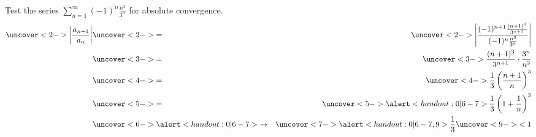 \begin{frame}
\begin{example} %
Test the series $\displaystyle \sum_{n=1}^\infty (-1)^n \frac{n^3}{3^n}$ for absolute convergence.
\abovedisplayskip=0pt
\belowdisplayskip=0pt
\begin{eqnarray*}
\uncover<2->{%
\left| \frac{a_{n+1}}{a_n}\right| %
}%
 & \uncover<2->{=} & %
\uncover<2->{%
\left| \frac{(-1)^{n+1}\frac{(n+1)^3}{3^{n+1}}}{(-1)^n\frac{n^3}{3^n}}\right| %
}\\%
 & \uncover<3->{=} & %
\uncover<3->{%
\frac{(n+1)^3}{3^{n+1}}\cdot \frac{3^n}{n^3}%
}\\%
 & \uncover<4->{=} & %
\uncover<4->{%
\frac{1}{3} \left( \frac{n+1}{n}\right)^3%
}\\%
 & \uncover<5->{=} & %
\uncover<5->{%
\alert<handout:0| 6-7>{%
\frac{1}{3} \left( 1 + \frac{1}{n}\right)^3%
}%
}\\%
 & \uncover<6->{\alert<handout:0| 6-7>{\to}} & %
\uncover<7->{%
\alert<handout:0| 6-7,9>{%
\frac{1}{3} \uncover<9->{ < 1 }
}%
}%
\end{eqnarray*}
%
\end{example}
\end{frame}
